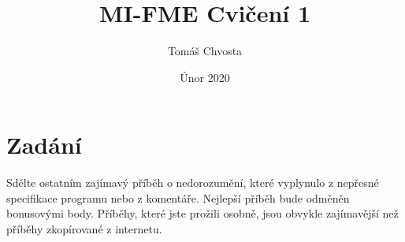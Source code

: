 \documentclass{article}
\title{MI-FME Cvičení 1}
\author{Tomáš Chvosta}
\date{Únor 2020}
\begin{document}
\maketitle

\section{Zadání}
Sdělte ostatním zajímavý příběh o nedorozumění, které vyplynulo z nepřesné specifikace programu nebo z komentáře. Nejlepší příběh bude odměněn bonusovými body. Příběhy, které jste prožili osobně, jsou obvykle zajímavější než příběhy zkopírované z internetu.
\end{document}
